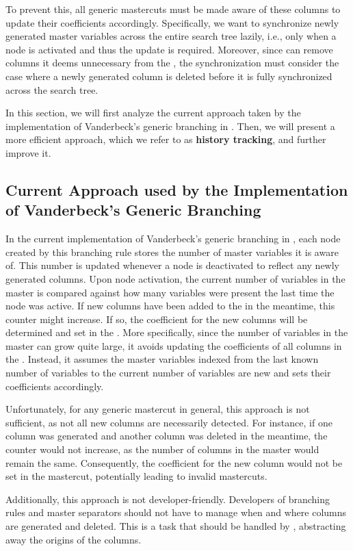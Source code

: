 To prevent this, all generic mastercuts must be made aware of these columns to update their coefficients accordingly. Specifically, we want to synchronize newly generated master variables across the entire search tree lazily, i.e., only when a node is activated and thus the update is required. Moreover, since \GCG{} can remove columns it deems unnecessary from the \MP{}, the synchronization must consider the case where a newly generated column is deleted before it is fully synchronized across the search tree.

In this section, we will first analyze the current approach taken by the implementation of Vanderbeck's generic branching in \GCG{}. Then, we will present a more efficient approach, which we refer to as \textbf{history tracking}, and further improve it.

\subsection{Current Approach used by the Implementation of Vanderbeck's Generic Branching}\label{subsec:gm_sync_current}
In the current implementation of Vanderbeck's generic branching in \GCG{}, each node created by this branching rule stores the number of master variables it is aware of. This number is updated whenever a node is deactivated to reflect any newly generated columns. Upon node activation, the current number of variables in the master is compared against how many variables were present the last time the node was active. If new columns have been added to the \RMP{} in the meantime, this counter might increase. If so, the coefficient for the new columns will be determined and set in the \RMP{}. More specifically, since the number of variables in the master can grow quite large, it avoids updating the coefficients of all columns in the \RMP{}. Instead, it assumes the master variables indexed from the last known number of variables to the current number of variables are new and sets their coefficients accordingly.

Unfortunately, for any generic mastercut in general, this approach is not sufficient, as not all new columns are necessarily detected. For instance, if one column was generated and another column was deleted in the meantime, the counter would not increase, as the number of columns in the master would remain the same. Consequently, the coefficient for the new column would not be set in the mastercut, potentially leading to invalid mastercuts.

Additionally, this approach is not developer-friendly. Developers of branching rules and master separators should not have to manage when and where columns are generated and deleted. This is a task that should be handled by \GCG{}, abstracting away the origins of the columns.

